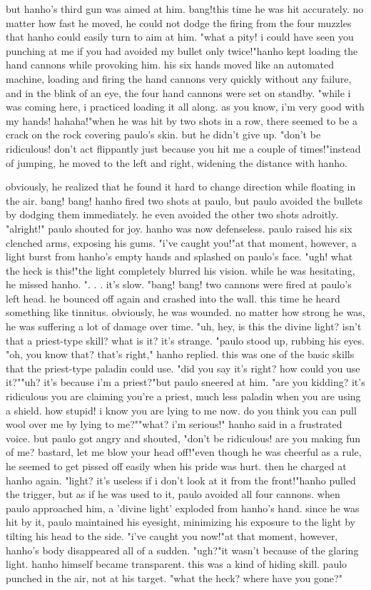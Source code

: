 but hanho's third gun was aimed at him.
bang!this time he was hit accurately.
 no matter how fast he moved, he could not dodge the firing from the four muzzles that hanho could easily turn to aim at him.
"what a pity! i could have seen you punching at me if you had avoided my bullet only twice!"hanho kept loading the hand cannons while provoking him.
his six hands moved like an automated machine, loading and firing the hand cannons very quickly without any failure, and in the blink of an eye, the four hand cannons were set on standby.
"while i was coming here, i practiced loading it all along.
 as you know, i'm very good with my hands! hahaha!"when he was hit by two shots in a row, there seemed to be a crack on the rock covering paulo's skin.
 but he didn't give up.
"don't be ridiculous! don't act flippantly just because you hit me a couple of times!"instead of jumping, he moved to the left and right, widening the distance with hanho.
 
obviously, he realized that he found it hard to change direction while floating in the air.
bang! bang! hanho fired two shots at paulo, but paulo avoided the bullets by dodging them immediately.
 he even avoided the other two shots adroitly.
"alright!" paulo shouted for joy.
 hanho was now defenseless.
paulo raised his six clenched arms, exposing his gums.
"i've caught you!"at that moment, however, a light burst from hanho's empty hands and splashed on paulo's face.
"ugh! what the heck is this!"the light completely blurred his vision.
 while he was hesitating, he missed hanho.
".
.
.
it's slow.
"bang! bang! two cannons were fired at paulo's left head.
 he bounced off again and crashed into the wall.
 this time he heard something like tinnitus.
 obviously, he was wounded.
 no matter how strong he was, he was suffering a lot of damage over time.
"uh, hey, is this the divine light? isn't that a priest-type skill? what is it? it's strange.
"paulo stood up, rubbing his eyes.
 "oh, you know that? that's right," hanho replied.
 this was one of the basic skills that the priest-type paladin could use.
"did you say it's right? how could you use it?""uh? it's because i'm a priest?"but paulo sneered at him.
"are you kidding? it's ridiculous you are claiming you're a priest, much less paladin when you are using a shield.
 how stupid! i know you are lying to me now.
 do you think you can pull wool over me by lying to me?""what? i'm serious!" hanho said in a frustrated voice.
but paulo got angry and shouted, "don't be ridiculous! are you making fun of me? bastard, let me blow your head off!"even though he was cheerful as a rule, he seemed to get pissed off easily when his pride was hurt.
 then he charged at hanho again.
"light? it's useless if i don't look at it from the front!"hanho pulled the trigger, but as if he was used to it, paulo avoided all four cannons.
when paulo approached him, a 'divine light' exploded from hanho's hand.
since he was hit by it, paulo maintained his eyesight, minimizing his exposure to the light by tilting his head to the side.
"i've caught you now!"at that moment, however, hanho's body disappeared all of a sudden.
"ugh?"it wasn't because of the glaring light.
 hanho himself became transparent.
 this was a kind of hiding skill.
paulo punched in the air, not at his target.
 "what the heck? where have you gone?"

